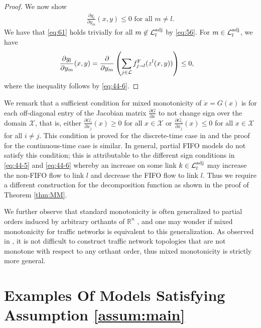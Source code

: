 \documentclass[letterpaper, 10 pt, conference]{ieeeconf}
\newcommand{\sra}{\shortrightarrow}
\newcommand{\Links}{\mathcal{L}}
\newcommand{\Ladj}{\mathcal{L}^\textnormal{adj}}
\newcommand{\Dom}{\mathcal{X}}
\begin{document}
\begin{proof}
We now show
\begin{align}
  \label{eq:61}
  \frac{\partial g_l}{\partial y_m}(x,y)\leq 0 \text{ for all } m\neq l.
\end{align}
We have that \eqref{eq:61} holds trivially for all $m\not\in\Ladj_l$ by \eqref{eq:56}. For $m\in\Ladj_l$, we have
\begin{align}
  \label{eq:1}
    \frac{\partial g_l}{\partial y_m}(x,y) &= \frac{\partial}{\partial y_m}\left(\sum_{j\in\Links} \fF_{j\sra l}(z^l(x,y))\right)\leq 0,
\end{align}
where the inequality follows by \ref{eq:44-6}.
\end{proof}


We remark that a sufficient condition for mixed monotonicity of $\dot{x}=G(x)$ is for each off-diagonal entry of the Jacobian matrix $\frac{\partial G}{\partial x}$ to not change sign over the domain $\Dom$, that is, either $\frac{\partial G_i}{\partial x_j}(x)\geq 0$ for all $x\in\Dom$  or $\frac{\partial G_i}{\partial x_j}(x)\leq 0$ for all $x\in\Dom$ for all $i\neq j$. This condition is proved for the discrete-time case in \cite{Coogan:2014ty} and the proof for the continuous-time case is similar. In general, partial FIFO models do not satisfy this condition; this is attributable to the different sign conditions in \ref{eq:44-5} and \ref{eq:44-6} whereby an increase on some link $k\in\Ladj_l$ may increase the non-FIFO flow to link $l$ and decrease the FIFO flow to link $l$. Thus we require a different construction for the decomposition function as shown in the proof of Theorem \ref{thm:MM}. 

We further observe that standard monotonicity is often generalized to partial orders induced by arbitrary orthants of $\mathbb{R}^n$ \cite{Angeli:2003fv}, and one may wonder if mixed monotonicity for traffic networks is equivalent to this generalization. As observed in \cite{Coogan:2015mz}, it is not difficult to construct traffic network topologies that are not monotone with respect to any orthant order, thus mixed monotonicity is strictly more general.










\section{Examples Of Models Satisfying Assumption \ref{assum:main}}
\label{sec:examples}
\end{document}
